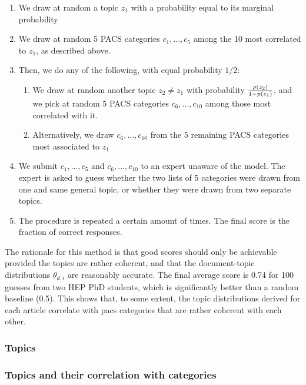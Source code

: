 \documentclass[smallextended]{svjour3}
\begin{document}
\begin{enumerate}
    \item We draw at random a topic $z_1$ with a probability equal to its marginal probability 
    \item We draw at random 5 PACS categories $c_1,...,c_5$ among the 10 most correlated to $z_1$, as described above.
    \item Then, we do any of the following, with equal probability $1/2$:
    \begin{enumerate}
        \item We draw at random another topic $z_2\neq z_1$ with probability $p(z_2)\over 1-p(z_1)$, and we pick at random 5 PACS categories $c_6,...,c_{10}$ among those most correlated with it.
        \item Alternatively, we draw  $c_6,...,c_{10}$ from the 5 remaining PACS categories most associated to $z_1$
    \end{enumerate}
    \item We submit $c_1, ..., c_5$ and $c_6, ..., c_{10}$ to an expert unaware of the model. The expert is asked to guess whether the two lists of 5 categories were drawn from one and same general topic, or whether they were drawn from two separate topics.
    \item The procedure is repeated a certain amount of times. The final score is the fraction of correct responses.
\end{enumerate}

The rationale for this method is that good scores should only be achievable provided the topics are rather coherent, and that the document-topic distributions $\theta_{d,i}$ are reasonably accurate. The final average score is 0.74 for 100 guesses from two HEP PhD students, which is significantly better than a random baseline (0.5). This shows that, to some extent, the topic distributions derived for each article correlate with \gls{pacs} categories that are rather coherent with each other.

\subsubsection{Topics}


\fontsize{6}{7}\selectfont\normalsize
\fontsize{6}{7}\selectfont\normalsize

\subsubsection{\label{appendix:topics_categories}Topics and their correlation with categories}
\end{document}
